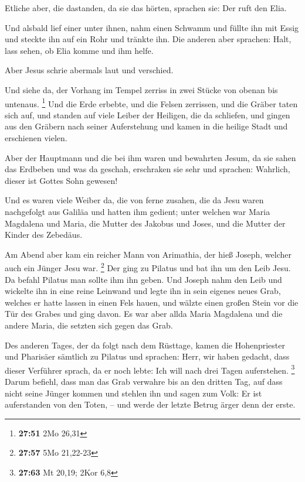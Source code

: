  Etliche aber, die dastanden, da sie das hörten, sprachen
sie: Der ruft den Elia.

 Und alsbald lief einer unter ihnen, nahm einen Schwamm und
füllte ihn mit Essig und steckte ihn auf ein Rohr und tränkte ihn.
 Die anderen aber sprachen: Halt, lass sehen, ob Elia komme
und ihm helfe.

 Aber Jesus schrie abermals laut und verschied.

 Und siehe da, der Vorhang im Tempel zerriss in zwei Stücke
von obenan bis untenaus. \footnote{\textbf{27:51} 2Mo 26,31}
 Und die Erde erbebte, und die Felsen zerrissen, und die
Gräber taten sich auf, und standen auf viele Leiber der Heiligen, die da
schliefen,  und gingen aus den Gräbern nach seiner
Auferstehung und kamen in die heilige Stadt und erschienen vielen.

 Aber der Hauptmann und die bei ihm waren und bewahrten
Jesum, da sie sahen das Erdbeben und was da geschah, erschraken sie sehr
und sprachen: Wahrlich, dieser ist Gottes Sohn gewesen!

 Und es waren viele Weiber da, die von ferne zusahen, die
da Jesu waren nachgefolgt aus Galiläa und hatten ihm gedient;
 unter welchen war Maria Magdalena und Maria, die Mutter
des Jakobus und Joses, und die Mutter der Kinder des Zebedäus.

 Am Abend aber kam ein reicher Mann von Arimathia, der hieß
Joseph, welcher auch ein Jünger Jesu war. \footnote{\textbf{27:57} 5Mo
  21,22-23}  Der ging zu Pilatus und bat ihn um den Leib
Jesu. Da befahl Pilatus man sollte ihm ihn geben.  Und
Joseph nahm den Leib und wickelte ihn in eine reine Leinwand
 und legte ihn in sein eigenes neues Grab, welches er hatte
lassen in einen Fels hauen, und wälzte einen großen Stein vor die Tür
des Grabes und ging davon.  Es war aber allda Maria
Magdalena und die andere Maria, die setzten sich gegen das Grab.

 Des anderen Tages, der da folgt nach dem Rüsttage, kamen
die Hohenpriester und Pharisäer sämtlich zu Pilatus  und
sprachen: Herr, wir haben gedacht, dass dieser Verführer sprach, da er
noch lebte: Ich will nach drei Tagen auferstehen. \footnote{\textbf{27:63}
  Mt 20,19; 2Kor 6,8}  Darum befiehl, dass man das Grab
verwahre bis an den dritten Tag, auf dass nicht seine Jünger kommen und
stehlen ihn und sagen zum Volk: Er ist auferstanden von den Toten, --
und werde der letzte Betrug ärger denn der erste.


